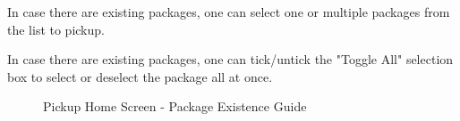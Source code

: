 In case there are existing packages, one can select one or multiple packages from the list to pickup. 

In case there are existing packages, one can tick/untick the "Toggle All" selection box to select or deselect the package all at once. 

\begin{figure}[H]
	\centering
	\hspace{5pt}
	\caption{Pickup Home Screen - Package Existence Guide}
	\label{fig:PickupHomeScreen-1}
\end{figure}

